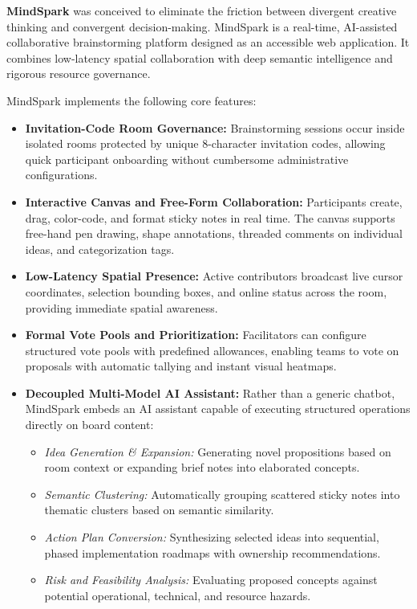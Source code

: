 \textbf{MindSpark} was conceived to eliminate the friction between divergent creative thinking and convergent decision-making. MindSpark is a real-time, AI-assisted collaborative brainstorming platform designed as an accessible web application. It combines low-latency spatial collaboration with deep semantic intelligence and rigorous resource governance. 

\noindent MindSpark implements the following core features:

\begin{itemize}[leftmargin=1.5em]
    \item \textbf{Invitation-Code Room Governance:} Brainstorming sessions occur inside isolated rooms protected by unique 8-character invitation codes, allowing quick participant onboarding without cumbersome administrative configurations.
    \item \textbf{Interactive Canvas and Free-Form Collaboration:} Participants create, drag, color-code, and format sticky notes in real time. The canvas supports free-hand pen drawing, shape annotations, threaded comments on individual ideas, and categorization tags.
    \item \textbf{Low-Latency Spatial Presence:} Active contributors broadcast live cursor coordinates, selection bounding boxes, and online status across the room, providing immediate spatial awareness.
    \item \textbf{Formal Vote Pools and Prioritization:} Facilitators can configure structured vote pools with predefined allowances, enabling teams to vote on proposals with automatic tallying and instant visual heatmaps.
    \item \textbf{Decoupled Multi-Model AI Assistant:} Rather than a generic chatbot, MindSpark embeds an AI assistant capable of executing structured operations directly on board content:
    \begin{itemize}[leftmargin=1.2em]
        \item \textit{Idea Generation \& Expansion:} Generating novel propositions based on room context or expanding brief notes into elaborated concepts.
        \item \textit{Semantic Clustering:} Automatically grouping scattered sticky notes into thematic clusters based on semantic similarity.
        \item \textit{Action Plan Conversion:} Synthesizing selected ideas into sequential, phased implementation roadmaps with ownership recommendations.
        \item \textit{Risk and Feasibility Analysis:} Evaluating proposed concepts against potential operational, technical, and resource hazards.

\end{itemize}
\end{itemize}
